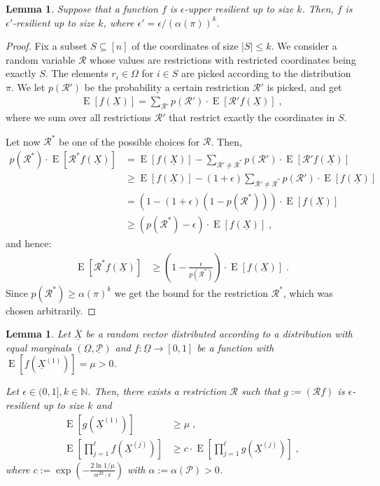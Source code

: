 \documentclass{daj}
\newcommand{\1}{\mathbbm{1}}
\theoremstyle{plain}
\newtheorem{lemma}[theorem]{Lemma}
\theoremstyle{definition}
\DeclareMathOperator*{\EE}{E}
\newcommand{\cR}{\mathcal{R}}
\begin{document}
\begin{lemma}
\label{lem:stability-equivalence}
Suppose that a function $f$ is $\epsilon$-upper resilient up to size $k$.
Then, $f$ is $\epsilon'$-resilient up to size $k$, where 
$\epsilon' = \epsilon/(\alpha(\pi))^k$.
\end{lemma} 
\begin{proof}
Fix a subset $S \subseteq [n]$ of the coordinates of size $|S| \le k$.
We consider a random variable $\cR$ whose values are
restrictions with restricted coordinates being exactly $S$.
The elements $r_i \in \Omega$ for $i \in S$ are picked according to the 
distribution $\pi$.
We let $p(\cR')$ be the probability a certain restriction $\cR'$ is picked, and
get
\begin{align}
  \EE[f(\underline{X})] =
  \sum_{{\cR}'} p({\cR}') \cdot \EE \left[ \cR' f(\underline{X}) \right] 
  \; ,
\end{align}
where we sum over all restrictions $\cR'$ that restrict exactly the coordinates
in $S$.

Let now $\cR^*$ be one of the possible choices for $\cR$.
Then,
\begin{align*}
p(\cR^*) \cdot \EE[\cR^* f(\underline{X})]
&= \EE[f(\underline{X})] - \sum_{\cR' \neq \cR^*}p(\cR')\cdot
\EE[\cR' f(\underline{X})]
\\
&\geq
\EE[f(\underline{X})] - (1+\epsilon)
\sum_{\cR' \neq \cR^*}p(\cR')\cdot \EE[f(\underline{X})]
\\
&=
\left(1 - (1+\epsilon)(1-p(\cR^*))\right) \cdot \EE[f(\underline{X})]
\\
&\geq \left(p(\cR^*) -\epsilon\right) \cdot \EE[f(\underline{X})] \; ,
\end{align*}
and hence:
\begin{align*}
\EE[ \cR^* f(\underline{X}) ]
&\geq \left(1 - \frac{\epsilon}{p(\cR^*)}\right) \cdot \EE[f(\underline{X})]\;.
\end{align*}
Since $p(\cR^*)  \geq \alpha(\pi)^k$ we get the bound
for the restriction $\cR^*$, which was chosen arbitrarily.
\end{proof}

\begin{lemma}\label{lem:restrictToMakeStable}
Let $\overline{\underline{X}}$ be a random vector distributed according to
a distribution with equal marginals 
$(\underline{\Omega}, \underline{\mathcal{P}})$
and $f: \underline{\Omega} \to [0, 1]$ be a function
with $\EE[f(\underline{X}^{(1)})] = \mu > 0$.

Let $\epsilon \in (0,1], k \in \mathbb{N}$. Then, there exists
a restriction $\cR$ such that $g := (\cR f)$ is $\epsilon$-resilient
up to size $k$ and
\begin{align}
\EE[g(\underline{X}^{(1)})] &\geq \mu 
                              \label{eq:241a}\;,\\
\EE \left[ \prod_{j=1}^{\ell} f(\underline{X}^{(j)}) \right] &\ge 
c \cdot \EE \left[ \prod_{j=1}^{\ell} g(\underline{X}^{(j)}) \right] \; ,
\label{eq:3a}
\end{align}
where $c := \exp\left(-\frac{2 \ln 1/\mu}{\alpha^{2k} \cdot \epsilon} \right)$ 
with $\alpha := \alpha(\mathcal{P}) > 0$.
\end{lemma}
\end{document}

